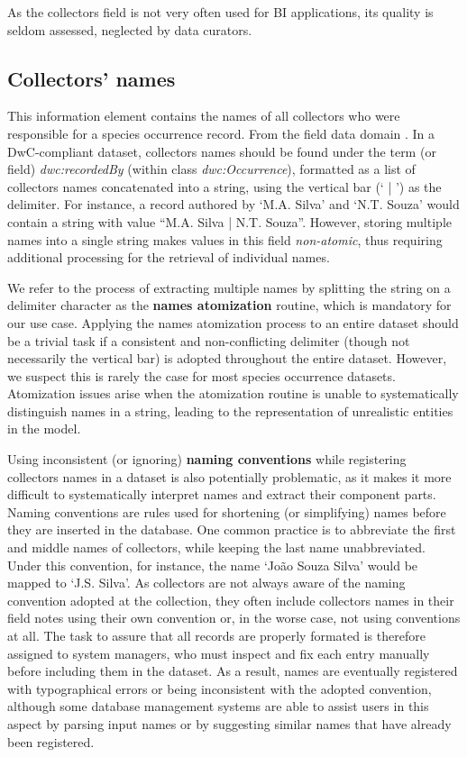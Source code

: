 As the collectors field is not very often used for BI applications, its quality is seldom assessed, neglected by data curators.



\subsection{Collectors' names}\label{section:data_req_collector}
This information element contains the names of all collectors who were responsible for a species occurrence record.
From the field data domain \cite{Dalcin2005}.
In a DwC-compliant dataset, collectors names should be found under the term (or field) \textit{dwc:recordedBy} (within class \textit{dwc:Occurrence}), formatted as a list of collectors names concatenated into a string, using the vertical bar (` | ') as the delimiter.
For instance, a record authored by `M.A. Silva' and `N.T. Souza' would contain a string with value ``M.A. Silva | N.T. Souza''.
However, storing multiple names into a single string makes values in this field \textit{non-atomic}, thus requiring additional processing for the retrieval of individual names.

We refer to the process of extracting multiple names by splitting the string on a delimiter character as the \textbf{names atomization} routine, which is mandatory for our use case.
Applying the names atomization process to an entire dataset should be a trivial task if a consistent and non-conflicting delimiter (though not necessarily the vertical bar) is adopted throughout the entire dataset.
However, we suspect this is rarely the case for most species occurrence datasets.
Atomization issues arise when the atomization routine is unable to systematically distinguish names in a string, leading to the representation of unrealistic entities in the model.

Using inconsistent (or ignoring) \textbf{naming conventions} while registering collectors names in a dataset is also potentially problematic, as it makes it more difficult to systematically interpret names and extract their component parts.
Naming conventions are rules used for shortening (or simplifying) names before they are inserted in the database.
One common practice is to abbreviate the first and middle names of collectors, while keeping the last name unabbreviated.
Under this convention, for instance, the name `João Souza Silva' would be mapped to `J.S. Silva'.
As collectors are not always aware of the naming convention adopted at the collection, they often include collectors names in their field notes using their own convention or, in the worse case, not using conventions at all.
The task to assure that all records are properly formated is therefore assigned to system managers, who must inspect and fix each entry manually before including them in the dataset.
As a result, names are eventually registered with typographical errors or being inconsistent with the adopted convention, although some database management systems are able to assist users in this aspect by parsing input names or by suggesting similar names that have already been registered.

